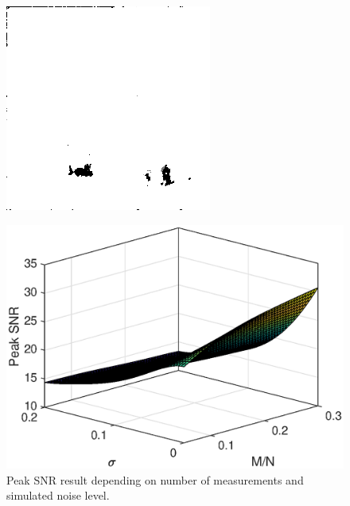 \begin{figure}[H]
\begin{minipage}[t]{0.245\textwidth}
    \label{fig:noise_30_6}
    \includegraphics[width = \textwidth]{result/noisy/1_30_0.png}
    \label{fig:noise_30_0}
\end{minipage}
\end{figure}

\begin{figure}[H]
    \centering
    \includegraphics[width = 0.7\linewidth]{result/synt_sss/PSNR_fit.eps}
    \caption{Peak SNR result depending on number of measurements and simulated noise level.}
    \label{fig:psnr_3d}
\end{figure}

